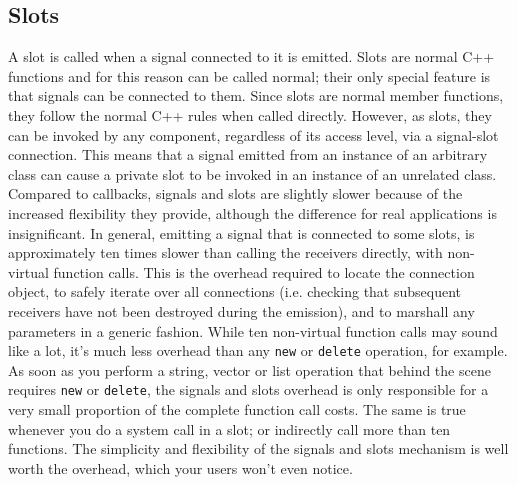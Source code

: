 \subsection{Slots}
\label{ssec:soft-slots}
A slot is called when a signal connected to it is emitted. Slots are normal C++
functions and for this reason can be called normal; their only special feature
is that signals can be connected to them.
%
Since slots are normal member functions, they follow the normal C++ rules when
called directly. However, as slots, they can be invoked by any component,
regardless of its access level, via a signal-slot connection. This means that a
signal emitted from an instance of an arbitrary class can cause a private slot
to be invoked in an instance of an unrelated class.
%
Compared to callbacks, signals and slots are slightly slower because of the
increased flexibility they provide, although the difference for real
applications is insignificant. In general, emitting a signal that is connected
to some slots, is approximately ten times slower than calling the receivers
directly, with non-virtual function calls. This is the overhead required to
locate the connection object, to safely iterate over all connections (i.e.
checking that subsequent receivers have not been destroyed during the emission),
and to marshall any parameters in a generic fashion. 
While ten non-virtual function calls may sound like a lot, it's much less
overhead than any \texttt{new} or \texttt{delete} operation, for example. As
soon as you perform a string, vector or list operation that behind the scene
requires \texttt{new} or \texttt{delete}, the signals and slots overhead is only
responsible for a very small proportion of the complete function call costs. The
same is true whenever you do a system call in a slot; or indirectly call more
than ten functions. 
The simplicity and flexibility of the signals and slots mechanism is well worth
the overhead, which your users won't even notice.\cite{Qt:signal-slot}
